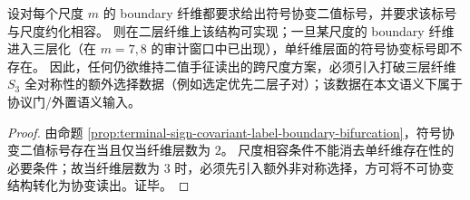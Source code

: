 \begin{corollary}[跨尺度二值手征保持的对称破缺必需性]\label{cor:terminal-cross-scale-binary-chirality-symmetry-breaking}
设对每个尺度 \(m\) 的 boundary 纤维都要求给出符号协变二值标号，并要求该标号与尺度约化相容。
则在二层纤维上该结构可实现；一旦某尺度的 boundary 纤维进入三层化（在 \(m=7,8\) 的审计窗口中已出现），单纤维层面的符号协变标号即不存在。
因此，任何仍欲维持二值手征读出的跨尺度方案，必须引入打破三层纤维 \(S_3\) 全对称性的额外选择数据（例如选定优先二层子对）；该数据在本文语义下属于协议门/外置语义输入。
\end{corollary}
\begin{proof}
由命题 \ref{prop:terminal-sign-covariant-label-boundary-bifurcation}，符号协变二值标号存在当且仅当纤维层数为 \(2\)。
尺度相容条件不能消去单纤维存在性的必要条件；故当纤维层数为 \(3\) 时，必须先引入额外非对称选择，方可将不可协变结构转化为协变读出。证毕。
\end{proof}
